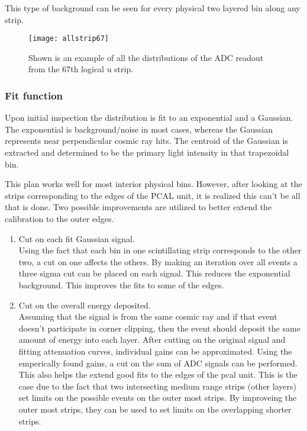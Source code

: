 This type of background can be seen for every physical two layered bin along any strip.

\begin{figure}[h]
    \centering
    \texttt{[image: allstrip67]}
    \caption{Shown is an example of all the distributions of the ADC readout from the 67th logical u strip.}
    \label{fig:allstrip67}
\end{figure}


\FloatBarrier
\subsubsection{Fit function}
Upon initial inspection the distribution is fit to an exponential and a Gaussian. 
The exponential is background/noise in most cases, whereas the Gaussian represents near perpendicular cosmic ray hits. 
The centroid of the Gaussian is extracted and determined to be the primary light intensity in that trapezoidal bin.

This plan works well for most interior physical bins. However, after looking at the strips corresponding to the edges of the PCAL unit, it is realized this can't be all that is done. Two possible improvements are utilized to better extend the calibration to the outer edges.

\begin{enumerate}
    \item Cut on each fit Gaussian signal. \\
        Using the fact that each bin in one scintillating strip corresponds to the other two, a cut on one affects the others. By making an iteration over all events a three sigma cut can be placed on each signal. This reduces the exponential background. This improves the fits to some of the edges.
    \item Cut on the overall energy deposited. \\
        Assuming that the signal is from the same cosmic ray and if that event doesn't participate in corner clipping, then the event should deposit the same amount of energy into each layer. After cutting on the original signal and fitting attenuation curves, individual gains can be approximated. Using the emperically found gains, a cut on the sum of ADC signals can be performed. This also helps the extend good fits to the edges of the pcal unit. This is the case due to the fact that two intersecting medium range strips (other layers) set limits on the possible events on the outer most strips. By improveing the outer most strips, they can be used to set limits on the overlapping shorter strips.  
\end{enumerate}

